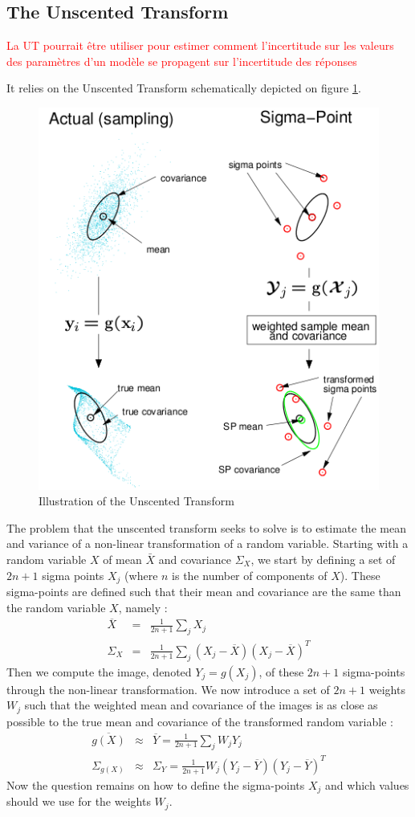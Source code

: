 \documentclass[10pt,oneside]{scrartcl}
\begin{document}
\subsection{The Unscented Transform}

\textcolor{red}{La UT pourrait être utiliser pour estimer comment
  l'incertitude sur les valeurs des paramètres d'un modèle se
  propagent sur l'incertitude des réponses}


 It relies on the Unscented Transform schematically depicted on figure \ref{fig:UT}.\\

\begin{figure}[htbp]
\begin{center}
\includegraphics[width=0.3\linewidth]{eps/UT2.png}
\end{center}
\caption{\label{fig:UT} Illustration of the Unscented Transform}
\end{figure}

The problem that the unscented transform seeks to solve is to estimate the mean and variance of a non-linear transformation of a random variable. Starting with a random variable $X$ of mean $\bar{X}$ and covariance $\Sigma_X$, we start by defining a set of $2n+1$ sigma points $X_j$ (where $n$ is the number of components of $X$). These sigma-points are defined such that their mean and covariance are the same than the random variable $X$, namely :
\begin{eqnarray}
\overline{X} &=& \frac{1}{2n+1} \sum_j X_j \\
\Sigma_X &=& \frac{1}{2n+1} \sum_j (X_j - \overline{X})(X_j - \overline{X})^T
\end{eqnarray}
 Then we compute the image, denoted $Y_j = g(X_j)$, of these $2n+1$ sigma-points through the non-linear transformation. We now introduce a set of $2n+1$ weights $W_j$ such that the weighted mean and covariance of the images is as close as possible to the true mean and covariance of the transformed random variable :
\begin{eqnarray}
\overline{g(X)} &\approx& \overline{Y} = \frac{1}{2n+1} \sum_j W_j Y_j\\
\Sigma_{g(X)} &\approx& \Sigma_Y = \frac{1}{2n+1} W_j (Y_j - \overline{Y})(Y_j - \overline{Y})^T
\end{eqnarray}
Now the question remains on how to define the sigma-points $X_j$ and which
values should we use for the weights $W_j$.
\end{document}
